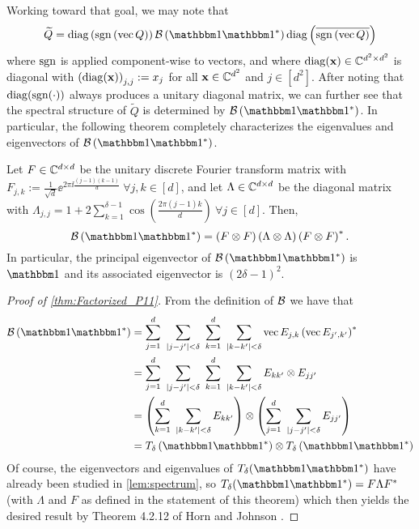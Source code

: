 Working toward that goal, we may note that
\begin{equation}
\widetilde{Q} = \diag \left( \sgn \left( \vec{Q} \right) \right) \B \left( \one \one^* \right) \diag \left( \overline{\sgn \left( \vec{Q} \right)} \right)
\label{equ:Qtilde_partial_factor}
\end{equation}
where $\operatorname{sgn}$ is applied component-wise to vectors, and where $\operatorname{diag}(\mathbf x)  \in \mathbb{C}^{d^2 \times d^2}$ is diagonal with $\left(\operatorname{diag}(\mathbf x)\right)_{j,j} := x_j$ for all $\mathbf x \in \mathbb{C}^{d^2}$ and $j \in [d^2]$.  After noting that $\operatorname{diag}(\operatorname{sgn}(\cdot))$ always produces a unitary diagonal matrix, we can further see that the spectral structure of $\widetilde{Q}$ is determined by $\B \left( \one \one^* \right)$.  In particular, the following theorem completely characterizes the eigenvalues and eigenvectors of $\B \left( \one \one^* \right)$.

\begin{theorem}
Let $F \in \mathbb{C}^{d \times d}$ be the unitary discrete Fourier transform matrix with $F_{j,k} := \frac{1}{\sqrt{d}} \ee^{2 \pi \ii \frac{(j-1)(k-1)}{d}} ~\forall j,k \in [d]$, and let $\Lambda \in \mathbb{C}^{d \times d}$ be the diagonal matrix with $\Lambda_{j,j} = 1 + 2 \sum^{\delta-1}_{k=1} \cos \left( \frac{2 \pi (j-1)k}{d} \right)~\forall j \in [d]$.  Then,
$$\B \left( \one \one^* \right) = \left( F \otimes F \right) \left( \Lambda \otimes \Lambda \right) \left( F \otimes F \right)^*.$$
In particular, the principal eigenvector of $\B \left( \one \one^* \right)$ is $\one$ and its associated eigenvector is $(2 \delta - 1)^2$. 
\label{thm:Factorized_P11}
\end{theorem}

\begin{proof}[Proof of \cref{thm:Factorized_P11}]
From the definition of $\mathcal{B}$ we have that 
\begin{align*}
  \B \left( \one \one^* \right) &= \sum^d_{j=1} ~\sum_{|j - j'| < \delta} ~\sum^d_{k=1} ~\sum_{|k - k'| < \delta}\vec{E_{j,k}} \left(\vec{E_{j',k'}} \right)^* \\
  &= \sum^d_{j=1} ~\sum_{|j - j'| < \delta} ~\sum^d_{k=1} ~\sum_{|k - k'| < \delta} E_{kk'} \otimes E_{jj'} \\
  &= \left(\sum^d_{k=1} ~\sum_{|k - k'| < \delta} E_{kk'}\right) \otimes \left( \sum^d_{j=1} ~\sum_{|j - j'| < \delta} E_{jj'} \right) \\
  &= T_\delta\left(\one \one^*\right) \otimes T_\delta \left(\one \one^*\right)
\end{align*}
Of course, the eigenvectors and eigenvalues of $T_\delta(\one \one^*)$ have already been studied in \cref{lem:spectrum}, so $T_\delta(\one \one^*) = F \Lambda F^*$ (with $\Lambda$ and $F$ as defined in the statement of this theorem) which then yields the desired result by Theorem 4.2.12 of Horn and Johnson \cite{horn1991topics}.
\end{proof}

